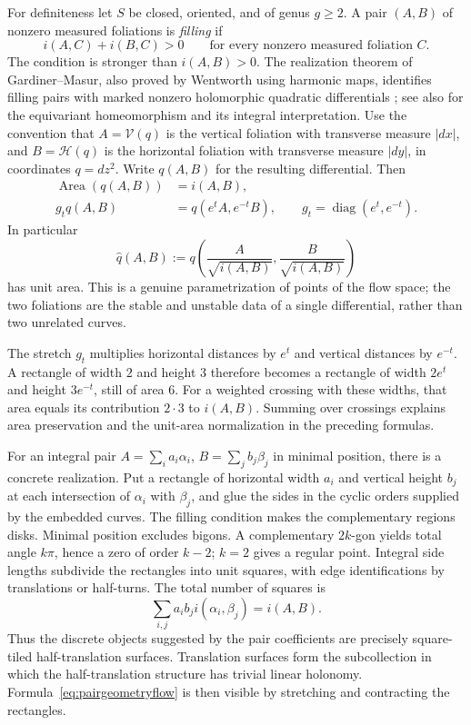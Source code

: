 For definiteness let $S$ be closed, oriented, and of genus $g\geq2$.
A pair $(A,B)$ of nonzero measured foliations is \emph{filling} if
\[
 i(A,C)+i(B,C)>0\qquad\text{for every nonzero measured foliation }C.
\]
The condition is stronger than $i(A,B)>0$.  The realization theorem of
Gardiner--Masur, also proved by Wentworth using harmonic maps, identifies
filling pairs with marked nonzero holomorphic quadratic differentials
\cite[Theorem~1.6 and Corollary~1.7]{WentworthGardiner}; see also
\cite[Theorem~1.6]{AranaHerreraSquare2020} for the equivariant
homeomorphism and its integral interpretation.
Use the convention that $A=\mathcal V(q)$ is the vertical foliation
with transverse measure $|dx|$, and $B=\mathcal H(q)$ is the horizontal
foliation with transverse measure $|dy|$, in coordinates $q=dz^2$.
Write $q(A,B)$ for the resulting differential.  Then
\begin{align}
 \operatorname{Area}(q(A,B))&=i(A,B),\\
 g_tq(A,B)&=q(e^tA,e^{-t}B),
 \qquad g_t=\operatorname{diag}(e^t,e^{-t}).
 \label{eq:pairgeometryflow}
\end{align}
In particular
\[
 \widehat q(A,B):=
 q\left(\frac{A}{\sqrt{i(A,B)}},
         \frac{B}{\sqrt{i(A,B)}}\right)
\]
has unit area.  This is a genuine parametrization of points of the
flow space; the two foliations are the stable and unstable data of a
single differential, rather than two unrelated curves.

The stretch $g_t$ multiplies horizontal distances by $e^t$ and
vertical distances by $e^{-t}$. A rectangle of width $2$ and
height $3$ therefore becomes a rectangle of width $2e^t$ and
height $3e^{-t}$, still of area $6$. For a weighted crossing
with these widths, that area equals its contribution $2\cdot3$
to $i(A,B)$. Summing over crossings explains area preservation
and the unit-area normalization in the preceding formulas.

For an integral pair
$A=\sum_i a_i\alpha_i$, $B=\sum_j b_j\beta_j$ in minimal position,
there is a concrete realization.  Put a rectangle of horizontal width
$a_i$ and vertical height $b_j$ at each intersection of $\alpha_i$
with $\beta_j$, and glue the sides in the cyclic orders supplied by
the embedded curves.  The filling condition makes the complementary
regions disks.  Minimal position excludes bigons.  A complementary
$2k$-gon yields total angle $k\pi$, hence a zero of order $k-2$;
$k=2$ gives a regular point.  Integral side lengths subdivide the
rectangles into unit squares, with edge identifications by translations
or half-turns.  The total number of squares is
\[
 \sum_{i,j}a_i b_j i(\alpha_i,\beta_j)=i(A,B).
\]
Thus the discrete objects suggested by the pair coefficients are
precisely square-tiled half-translation surfaces.  Translation surfaces
form the subcollection in which the half-translation structure has
trivial linear holonomy.  Formula~\eqref{eq:pairgeometryflow} is then
visible by stretching and contracting the rectangles.


